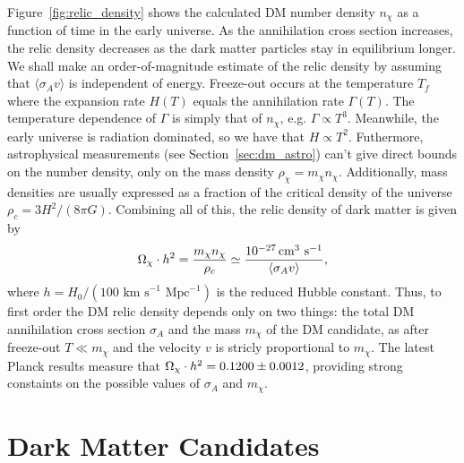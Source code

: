 Figure~\ref{fig:relic_density} shows the calculated DM number density $n_\chi$ as a function of time in the early universe.
As the annihilation cross section increases, the relic density decreases as the dark matter particles stay in equilibrium longer.
We shall make an order-of-magnitude estimate of the relic density by assuming that $\langle \sigma_A v \rangle$ is independent of energy.
Freeze-out occurs at the temperature $T_f$ where the expansion rate $H(T)$ equals the annihilation rate $\Gamma(T)$.
The temperature dependence of $\Gamma$ is simply that of $n_\chi$, e.g. $\Gamma \propto T^3$.
Meanwhile, the early universe is radiation dominated, so we have that $H \propto T^2$. 
Futhermore, astrophysical measurements (see Section~\ref{sec:dm_astro}) can't give direct bounds on the number density, only on the mass density $\rho_\chi = m_\chi n_\chi$. 
Additionally, mass densities are usually expressed as a fraction of the critical density of the universe $\rho_c = 3H^2/(8\pi G)$.
Combining all of this, the relic density of dark matter is given by 
\begin{equation}
  \label{eqn:relic_density}
  \Omega_\chi \cdot h^2 = \frac{m_\chi n_\chi}{\rho_c} \simeq \frac{10^{-27} \,\text{cm}^{3}\text{ s}^{-1}}{\langle \sigma_A v \rangle},
\end{equation}
where $h = H_0/(100 \text{ km s}^{-1}\text{ Mpc}^{-1})$ is the reduced Hubble constant. 
Thus, to first order the DM relic density depends only on two things: the total DM annihilation cross section $\sigma_A$ and the mass $m_\chi$ of the DM candidate, as after freeze-out $T \ll m_\chi$ and the velocity $v$ is stricly proportional to $m_\chi$. 
The latest Planck results measure that $\Omega_\chi \cdot h^2 = 0.1200 \pm 0.0012$, providing strong constaints on the possible values of $\sigma_A$ and $m_\chi$.

\section{Dark Matter Candidates}
\label{sec:dm_cand}

